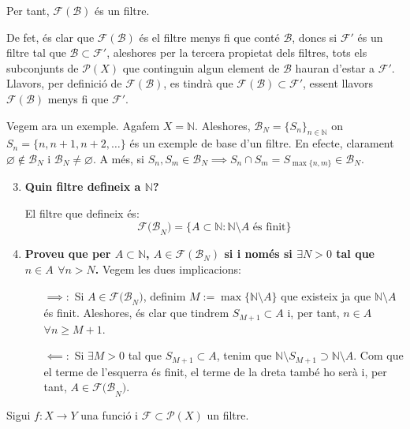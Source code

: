 \documentclass[10pt,a4paper]{article}
\newcommand{\NN}{\ensuremath{\mathbb{N}}}
\begin{document}
\begin{enumerate}
\begin{itemize}[leftmargin=0.95cm]
\begin{itemize}
                        \end{itemize}
                        Per tant, $\mathcal{F(B)}$ és un filtre.
            \end{itemize}
            De fet, és clar que $\mathcal{F(B)}$ és el filtre menys fi que conté $\mathcal{B}$, doncs si $\mathcal{F'}$ és un filtre tal que $\mathcal{B \subset F'}$, aleshores per la tercera propietat dels filtres, tots els subconjunts de $\mathcal{P}(X)$ que continguin algun element de $\mathcal{B}$ hauran d'estar a $\mathcal{F'}$. Llavors, per definició de $\mathcal{F(B)}$, es tindrà que $\mathcal{F(B) \subset F'}$, essent llavors $\mathcal{F(B)}$ menys fi que $\mathcal{F'}$.
\end{enumerate}
Vegem ara un exemple. Agafem $X= \mathbb N$. Aleshores, $\mathcal{B}_N=\{S_n\}_{n\in \mathbb N}$ on $S_n=\{n, n+1, n+2, \ldots\}$ és un exemple de base d'un filtre. En efecte, clarament $\varnothing \notin \mathcal{B}_N$ i $\mathcal{B}_N\ne\varnothing$.  A més, si $S_n, S_m \in \mathcal{B}_N \implies S_n \cap S_m = S_{\max\{n, m\}} \in \mathcal{B}_N$.
\begin{enumerate}\setcounter{enumi}{2}
      \item \textbf{Quin filtre defineix a $\NN$?}

            El filtre que defineix és:
            $$\mathcal{F(B}_N)= \{A\subset \mathbb N:\text{$\NN\setminus A$ és finit}\} $$
      \item \textbf{Proveu que per $A\subset \NN$, $A\in\mathcal{F}(\mathcal{B}_N)$ si i només si $\exists N>0$ tal que $n\in A$ $\forall n>N$.}
            Vegem les dues implicacions:
            \begin{itemize}[leftmargin=0.95cm]
                  \item [$\implies:$] Si $A\in \mathcal{F(B}_N)$, definim $M:=\max\{\NN\setminus A\}$ que existeix ja que $\NN\setminus A$ és finit. Aleshores, és clar que tindrem $S_{M+1}\subset A$ i, per tant, $n\in A$ $\forall n\geq M+1$.
                  \item [$\impliedby:$] Si $\exists M>0$ tal que $S_{M+1} \subset A$, tenim que $\NN\setminus S_{M+1} \supset\NN\setminus A$. Com que el terme de l'esquerra és finit, el terme de la dreta també ho serà i, per tant, $A\in\mathcal{F(B}_N)$.
            \end{itemize}
\end{enumerate}
Sigui $f:X\rightarrow Y$ una funció i $\mathcal{F}\subset\mathcal{P}(X)$ un filtre.
\end{document}
